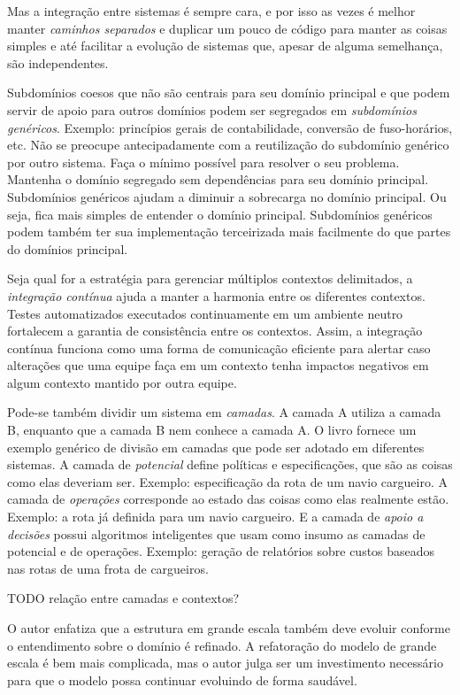\documentclass[a4paper, 12pt]{article}
\begin{document}
Mas a integração entre sistemas é sempre cara, e por isso as vezes é melhor manter \emph{caminhos separados} e duplicar um pouco de código para manter as coisas simples e até facilitar a evolução de sistemas que, apesar de alguma semelhança, são independentes.

Subdomínios coesos que não são centrais para seu domínio principal e que podem servir de apoio para outros domínios podem ser segregados em \emph{subdomínios genéricos}. Exemplo: princípios gerais de contabilidade, conversão de fuso-horários, etc. Não se preocupe antecipadamente com a reutilização do subdomínio genérico por outro sistema. Faça o mínimo possível para resolver o seu problema. Mantenha o domínio segregado sem dependências para seu domínio principal. Subdomínios genéricos ajudam a diminuir a sobrecarga no domínio principal. Ou seja, fica mais simples de entender o domínio principal. Subdomínios genéricos podem também ter sua implementação terceirizada mais facilmente do que partes do domínios principal.

Seja qual for a estratégia para gerenciar múltiplos contextos delimitados, a \emph{integração contínua} ajuda a manter a harmonia entre os diferentes contextos. Testes automatizados executados continuamente em um ambiente neutro fortalecem a garantia de consistência entre os contextos. Assim, a integração contínua funciona como uma forma de comunicação eficiente para alertar caso alterações que uma equipe faça em um contexto tenha impactos negativos em algum contexto mantido por outra equipe.

Pode-se também dividir um sistema em \emph{camadas}. A camada A utiliza a camada B, enquanto que a camada B nem conhece a camada A. O livro fornece um exemplo genérico de divisão em camadas que pode ser adotado em diferentes sistemas. A camada de \emph{potencial} define políticas e especificações, que são as coisas como elas deveriam ser. Exemplo: especificação da rota de um navio cargueiro. A camada de \emph{operações} corresponde ao estado das coisas como elas realmente estão. Exemplo: a rota já definida para um navio cargueiro. E a camada de \emph{apoio a decisões} possui algoritmos inteligentes que usam como insumo as camadas de potencial e de operações. Exemplo: geração de relatórios sobre custos baseados nas rotas de uma frota de cargueiros.

TODO relação entre camadas e contextos?

O autor enfatiza que a estrutura em grande escala também deve evoluir conforme o entendimento sobre o domínio é refinado. A refatoração do modelo de grande escala é bem mais complicada, mas o autor julga ser um investimento necessário para que o modelo possa continuar evoluindo de forma saudável.
\end{document}
